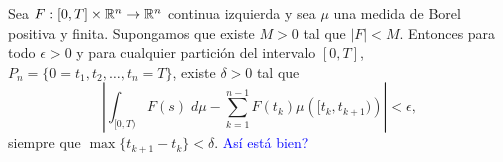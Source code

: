 \begin{thm}\label{th:R-S}
    Sea $F:[0,T]\times \mathbb{R}^n\to \mathbb{R}^n$ continua  izquierda y sea $\mu$ una medida de Borel positiva y finita. Supongamos que existe $M>0$ tal que $|F|<M$. Entonces para todo $\epsilon>0$ y para cualquier partición del intervalo $[0,T]$, $P_n=\{0=t_1, t_2, \ldots, t_n=T\}$, existe $\delta>0$ tal que 
      \begin{equation*}
    \left|\int_{[0,T)}F(s)\; d\mu - \sum_{k=1}^{n-1}F(t_k)\mu\left([t_k,t_{k+1})\right)\right|<\epsilon,
\end{equation*}   
siempre que $\max\{t_{k+1}-t_k\}<\delta$.
\textcolor{blue}{Así está bien?}\reversemarginpar{}\normalmarginpar
\end{thm}
